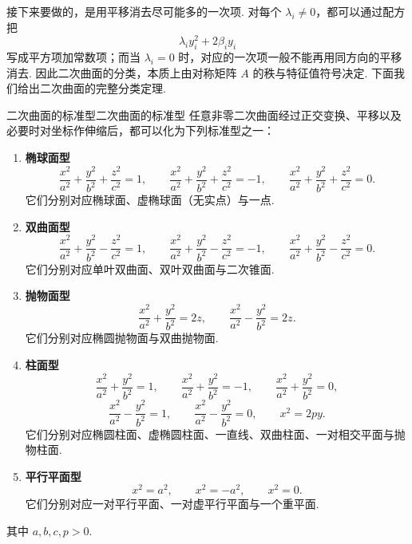 接下来要做的，是用平移消去尽可能多的一次项. 对每个 $\lambda_i \neq 0$，都可以通过配方把
\[
    \lambda_i y_i^2 + 2 \beta_i y_i
\]
写成平方项加常数项；而当 $\lambda_i = 0$ 时，对应的一次项一般不能再用同方向的平移消去. 因此二次曲面的分类，本质上由对称矩阵 $A$ 的秩与特征值符号决定. 下面我们给出二次曲面的完整分类定理.

\begin{theorem}{二次曲面的标准型}{二次曲面的标准型}
    任意非零二次曲面经过正交变换、平移以及必要时对坐标作伸缩后，都可以化为下列标准型之一：
    \begin{enumerate}
        \item \textbf{椭球面型}
        \[
            \frac{x^2}{a^2} + \frac{y^2}{b^2} + \frac{z^2}{c^2} = 1,
            \qquad
            \frac{x^2}{a^2} + \frac{y^2}{b^2} + \frac{z^2}{c^2} = -1,
            \qquad
            \frac{x^2}{a^2} + \frac{y^2}{b^2} + \frac{z^2}{c^2} = 0.
        \]
        它们分别对应椭球面、虚椭球面（无实点）与一点.

        \item \textbf{双曲面型}
        \[
            \frac{x^2}{a^2} + \frac{y^2}{b^2} - \frac{z^2}{c^2} = 1,
            \qquad
            \frac{x^2}{a^2} + \frac{y^2}{b^2} - \frac{z^2}{c^2} = -1,
            \qquad
            \frac{x^2}{a^2} + \frac{y^2}{b^2} - \frac{z^2}{c^2} = 0.
        \]
        它们分别对应单叶双曲面、双叶双曲面与二次锥面.

        \item \textbf{抛物面型}
        \[
            \frac{x^2}{a^2} + \frac{y^2}{b^2} = 2 z,
            \qquad
            \frac{x^2}{a^2} - \frac{y^2}{b^2} = 2 z.
        \]
        它们分别对应椭圆抛物面与双曲抛物面.

        \item \textbf{柱面型}
        \[
            \frac{x^2}{a^2} + \frac{y^2}{b^2} = 1,
            \qquad
            \frac{x^2}{a^2} + \frac{y^2}{b^2} = -1,
            \qquad
            \frac{x^2}{a^2} + \frac{y^2}{b^2} = 0,
        \]
        \[
            \frac{x^2}{a^2} - \frac{y^2}{b^2} = 1,
            \qquad
            \frac{x^2}{a^2} - \frac{y^2}{b^2} = 0,
            \qquad
            x^2 = 2 p y.
        \]
        它们分别对应椭圆柱面、虚椭圆柱面、一直线、双曲柱面、一对相交平面与抛物柱面.

        \item \textbf{平行平面型}
        \[
            x^2 = a^2,
            \qquad
            x^2 = - a^2,
            \qquad
            x^2 = 0.
        \]
        它们分别对应一对平行平面、一对虚平行平面与一个重平面.
    \end{enumerate}
    其中 $a, b, c, p > 0$.
\end{theorem}

